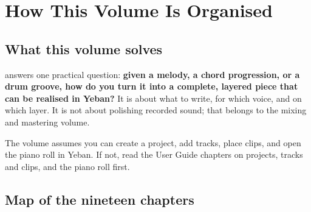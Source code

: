 \chapter*{How This Volume Is Organised}
\label{ch:plan}

\section*{What this volume solves}

\emph{} answers one practical question: \textbf{given a melody, a chord progression, or a drum groove, how do you turn it into a complete, layered piece that can be realised in Yeban?} It is about what to write, for which voice, and on which layer. It is not about polishing recorded sound; that belongs to the mixing and mastering volume.

The volume assumes you can create a project, add tracks, place clips, and open the piano roll in Yeban. If not, read the User Guide chapters on projects, tracks and clips, and the piano roll first.

\section*{Map of the nineteen chapters}

